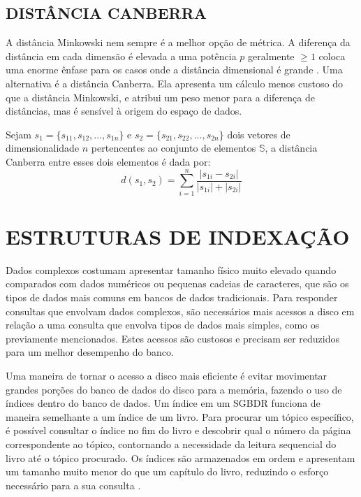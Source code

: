 \subsection{DISTÂNCIA CANBERRA}
A distância Minkowski nem sempre é a melhor opção de métrica. A diferença da distância em cada dimensão é elevada
a uma potência $p$ geralmente $\geq 1$  coloca uma enorme ênfase para os casos onde a distância dimensional é grande \cite{Kokare2007}.
Uma alternativa é a distância Canberra. Ela apresenta um cálculo menos custoso do que a distância Minkowski, e atribui um peso
menor para a diferença de distâncias, mas é sensível à origem do espaço de dados.
\begin{mydef}
 \label{def:canb}
 Sejam $s_1 = \{s_{11},s_{12},...,s_{1n}\}$ e $s_2 = \{s_{21},s_{22},...,s_{2n}\}$ dois vetores de dimensionalidade $n$ pertencentes ao conjunto de
  elementos $\mathbb{S}$, a distância Canberra entre esses dois elementos é dada por:
  \begin{equation}
   d(s_1,s_2) = \sum_{i=1}^{n}\frac{|s_{1i} - s_{2i}|}{|s_{1i}| + |s_{2i}|}
  \end{equation}
\end{mydef}


\section{ESTRUTURAS DE INDEXAÇÃO}
\label{sec:index}

Dados complexos costumam apresentar tamanho físico muito elevado quando comparados com dados numéricos ou pequenas cadeias de caracteres, que são os tipos de dados
mais comuns em bancos de dados tradicionais. Para responder consultas que envolvam dados complexos, são necessários mais acessos a disco em relação a uma consulta
que envolva tipos de dados mais simples, como os previamente mencionados. Estes acessos são custosos e precisam ser reduzidos para um melhor desempenho do banco.\par 

Uma maneira de tornar o acesso a disco mais eficiente é evitar movimentar grandes porções do banco de dados do disco para a memória, fazendo o uso de índices dentro do banco de dados. 
Um índice em um SGBDR funciona de maneira semelhante a um índice de um livro. Para procurar um tópico específico, é possível consultar o índice no fim do livro e descobrir qual o número da página
correspondente ao tópico, contornando a necessidade da leitura sequencial do livro até o tópico procurado. Os índices são armazenados em ordem e apresentam um tamanho
muito menor do que um capítulo do livro, reduzindo o esforço necessário para a sua consulta \cite{Silberschatz2011}.\par

